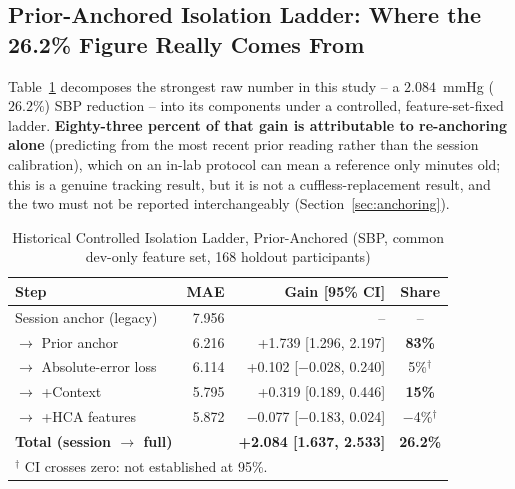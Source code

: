 \documentclass[12pt]{article}
\begin{document}
\subsection{Prior-Anchored Isolation Ladder: Where the 26.2\% Figure Really Comes From}
\label{sec:v21}
Table~\ref{tab:v21} decomposes the strongest raw number in this study -- a $2.084$~mmHg ($26.2\%$) SBP reduction -- into its components under a controlled, feature-set-fixed ladder. \textbf{Eighty-three percent of that gain is attributable to re-anchoring alone} (predicting from the most recent prior reading rather than the session calibration), which on an in-lab protocol can mean a reference only minutes old; this is a genuine tracking result, but it is not a cuffless-replacement result, and the two must not be reported interchangeably (Section~\ref{sec:anchoring}).
\begin{table}[t]
\centering
\caption{Historical Controlled Isolation Ladder, Prior-Anchored (SBP, common dev-only feature set, 168 holdout participants)}
\label{tab:v21}
\begin{tabular}{lrrc}
\toprule
Step & MAE & Gain [95\% CI] & Share \\
\midrule
Session anchor (legacy) & 7.956 & -- & -- \\
$\rightarrow$ Prior anchor & 6.216 & +1.739 [1.296, 2.197] & \textbf{83\%} \\
$\rightarrow$ Absolute-error loss & 6.114 & +0.102 [$-$0.028, 0.240] & 5\%$^\dagger$ \\
$\rightarrow$ +Context & 5.795 & +0.319 [0.189, 0.446] & \textbf{15\%} \\
$\rightarrow$ +HCA features & 5.872 & $-$0.077 [$-$0.183, 0.024] & $-$4\%$^\dagger$ \\
\midrule
\textbf{Total (session $\rightarrow$ full)} & & \textbf{+2.084 [1.637, 2.533]} & \textbf{26.2\%} \\
\bottomrule
\multicolumn{4}{l}{\footnotesize $^\dagger$ CI crosses zero: not established at 95\%.}
\end{tabular}
\end{table}
\end{document}
